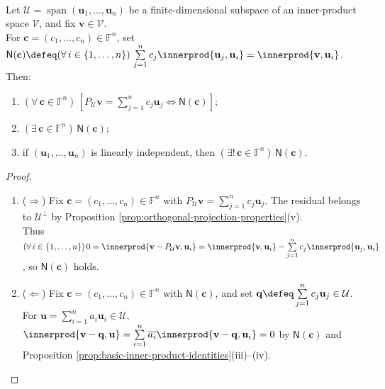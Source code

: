 \begin{theorem} \label{thm:normal-equations-for-projection} \\
Let $\mathcal{U}=\operatorname{span}(\mathbf{u}_1,\ldots,\mathbf{u}_n)$ be a finite-dimensional subspace of an inner-product space $\mathcal{V}$, and fix $\mathbf{v}\in\mathcal{V}$.\\
For $\mathbf{c}=(c_1,\ldots,c_n)\in\mathbb{F}^n$, set $\mathsf{N}(\mathbf{c})\defeq(\forall\,i\in\{1,\ldots,n\})\,\sum\limits_{j=1}^{n}c_j\innerprod{\mathbf{u}_j,\mathbf{u}_i}=\innerprod{\mathbf{v},\mathbf{u}_i}$. Then:
\begin{enumerate}[label=(\roman*)]
\setlength{\itemsep}{0pt}
\item $(\forall\,\mathbf{c}\in\mathbb{F}^n)\,[P_{\mathcal{U}}\mathbf{v}=\sum\limits_{j=1}^{n}c_j\mathbf{u}_j\Longleftrightarrow\mathsf{N}(\mathbf{c})]$;
\item $(\exists\,\mathbf{c}\in\mathbb{F}^n)\,\mathsf{N}(\mathbf{c})$;
\item if $(\mathbf{u}_1,\ldots,\mathbf{u}_n)$ is linearly independent, then $(\exists!\,\mathbf{c}\in\mathbb{F}^n)\,\mathsf{N}(\mathbf{c})$.
\end{enumerate}
\begin{proof}
\begin{enumerate}[label=(\roman*)]
\setlength{\itemsep}{0pt}
\item[$(i)$] ($\Rightarrow$) Fix $\mathbf{c}=(c_1,\ldots,c_n)\in\mathbb{F}^n$ with $P_{\mathcal{U}}\mathbf{v}=\sum\limits_{j=1}^{n}c_j\mathbf{u}_j$. The residual belongs to $\mathcal{U}^{\perp}$ by Proposition \ref{prop:orthogonal-projection-properties}(v).\\
Thus $(\forall\,i\in\{1,\ldots,n\})\,0=\innerprod{\mathbf{v}-P_{\mathcal{U}}\mathbf{v},\mathbf{u}_i}=\innerprod{\mathbf{v},\mathbf{u}_i}-\sum\limits_{j=1}^{n}c_j\innerprod{\mathbf{u}_j,\mathbf{u}_i}$, so $\mathsf{N}(\mathbf{c})$ holds.
\item[$(i)$] ($\Leftarrow$) Fix $\mathbf{c}=(c_1,\ldots,c_n)\in\mathbb{F}^n$ with $\mathsf{N}(\mathbf{c})$, and set $\mathbf{q}\defeq\sum\limits_{j=1}^{n}c_j\mathbf{u}_j\in\mathcal{U}$.\\
For $\mathbf{u}=\sum\limits_{i=1}^{n}a_i\mathbf{u}_i\in\mathcal{U}$, $\innerprod{\mathbf{v}-\mathbf{q},\mathbf{u}}=\sum\limits_{i=1}^{n}\overline{a_i}\innerprod{\mathbf{v}-\mathbf{q},\mathbf{u}_i}=0$ by $\mathsf{N}(\mathbf{c})$ and Proposition \ref{prop:basic-inner-product-identities}(iii)--(iv).\\

\end{enumerate}
\end{proof}
\end{theorem}
